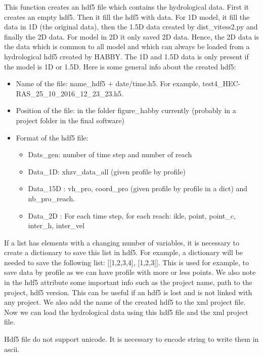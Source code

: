 \documentclass[letterpaper,10pt,english]{sphinxmanual}
\begin{document}
\begin{fulllineitems}
This function creates an hdf5 file which contains the hydrological data. First it creates an empty hdf5.
Then it fill the hdf5 with data. For 1D model, it fill the data in 1D (the original data), then the 1.5D data
created by dist\_vitess2.py and finally the 2D data. For model in 2D it only saved 2D data. Hence, the 2D data
is the data which is common to all model and which can always be loaded from a hydrological hdf5 created by
HABBY. The 1D and 1.5D data is only present if the model is 1D or 1.5D. Here is some general info about the
created hdf5:
\begin{itemize}
\item {} 
Name of the file: name\_hdf5  + date/time.h5.  For example, test4\_HEC-RAS\_25\_10\_2016\_12\_23\_23.h5.

\item {} 
Position of the file: in the folder  figure\_habby currently (probably in a project folder in the final software)

\item {} 
Format of the hdf5 file:
\begin{itemize}
\item {} 
Dats\_gen:  number of time step and number of reach

\item {} 
Data\_1D:  xhzv\_data\_all (given profile by profile)

\item {} 
Data\_15D :  vh\_pro, coord\_pro (given profile by profile in a dict) and nb\_pro\_reach.

\item {} 
Data\_2D : For each time step, for each reach: ikle, point, point\_c, inter\_h, inter\_vel

\end{itemize}

\end{itemize}

If a list has elements with a changing number of variables, it is necessary to create a dictionary to save
this list in hdf5. For example, a dictionary will be needed to save the following list: {[}{[}1,2,3,4{]}, {[}1,2,3{]}{]}.
This is used for example, to save data by profile as we can have profile with more or less points. We also note
in the hdf5 attribute some important info such as the project name, path to the project, hdf5 version.
This can be useful if an hdf5 is lost and is not linked with any project. We also add the name of the created
hdf5 to the xml project file. Now we can load the hydrological data using this hdf5 file and the xml project file.

Hdf5 file do not support unicode. It is necessary to encode string to write them in ascii.

\end{fulllineitems}
\end{document}
